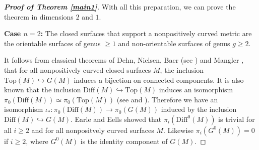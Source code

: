 \documentclass[onecolumn,notitlepage,11pt]{article}
\newcommand{\refer}[1]{\hyperref[#1]{\ref*{#1}}}%
\newcommand{\Diff}{\mbox{Diff}}
\theoremstyle{definition}
\begin{document}
\begin{proof}[\textbf{Proof of Theorem \refer{main1}}]
With all this preparation, we can prove the theorem in dimensions $2$ and $1$.

\textbf{Case $n=2$:}
The closed surfaces that support a nonpositively curved metric are the
orientable surfaces of genus $\geq 1$ and non-orientable surfaces of genus
$g\geq 2$. 

It follows from classical theorems of Dehn, Nielsen, Baer 
(see \cite[Theorem 8.1]{farb})
and Mangler \cite{mangler}, that for all nonpositively curved 
closed surfaces $M$,
the inclusion $\mbox{Top}(M)\hookrightarrow G(M)$ induces a bijection on connected
components. It is also known that the inclusion
$\Diff(M)\hookrightarrow\mbox{Top}(M)$ induces an isomorphism
$\pi_0(\mbox{Diff}(M))\simeq\pi_0(\mbox{Top}(M))$ 
(see \cite[Theorem 1.13]{farb} and \cite{EE69}).
Therefore we have an isomorphism $\iota_*:\pi_0(\mbox{Diff}(M))\to\pi_0(G(M))$ induced by the inclusion 
$\Diff(M)\hookrightarrow G(M)$.
Earle and Eells \cite{EE69} showed that $\pi_i(\mbox{Diff}^0(M))$ is trivial for all
$i\geq 2$ and for all nonpositvely curved surfaces $M$. Likewise
 $\pi_i(G^0(M))=0$ if $i\geq 2$, where $G^0(M)$ is the identity
 component of $G(M)$.
 

\end{proof}
\end{document}
